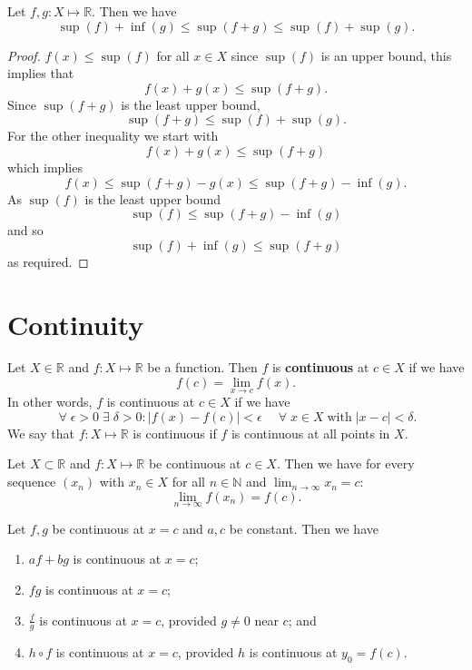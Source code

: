 \begin{proposition}
    Let $f,g:X\mapsto\mathbb R$. Then we have \[\sup(f)+\inf(g)\leq\sup(f+g)\leq\sup(f)+\sup(g).\]
\end{proposition}

\begin{proof}
    $f(x)\leq\sup(f)$ for all $x\in X$ since $\sup(f)$ is an upper bound, this implies that \[f(x)+g(x)\leq\sup(f+g).\] Since $\sup(f+g)$ is the least upper bound, \[\sup(f+g)\leq\sup(f)+\sup(g).\] For the other inequality we start with \[f(x)+g(x)\leq\sup(f+g)\] which implies \[f(x)\leq\sup(f+g)-g(x)\leq\sup(f+g)-\inf(g).\] As $\sup(f)$ is the least upper bound \[\sup(f)\leq\sup(f+g)-\inf(g)\] and so \[\sup(f)+\inf(g)\leq\sup(f+g)\] as required.
\end{proof}

\section{Continuity}

\begin{definition}
    Let $X\in\mathbb R$ and $f:X\mapsto\mathbb R$ be a function. Then $f$ is \textbf{continuous} at $c\in X$ if we have \[f(c)=\lim_{x\to c}f(x).\] In other words, $f$ is continuous at $c\in X$ if we have \[\;\forall\;\epsilon>0\;\exists\;\delta>0:|f(x)-f(c)|<\epsilon\quad\;\forall\;x\in X\;\text{with}\;|x-c|<\delta.\] We say that $f:X\mapsto\mathbb R$ is continuous if $f$ is continuous at all points in $X$.
\end{definition}

\begin{corollary}
    Let $X\subset\mathbb R$ and $f:X\mapsto\mathbb R$ be continuous at $c\in X$. Then we have for every sequence $(x_n)$ with $x_n\in X$ for all $n\in\mathbb N$ and $\lim_{n\to\infty}x_n=c$: \[\lim_{n\to\infty}f(x_n)=f(c).\]
\end{corollary}

\begin{theorem}
    Let $f,g$ be continuous at $x=c$ and $a,c$ be constant. Then we have
    \begin{enumerate}
        \item $af+bg$ is continuous at $x=c$;
        \item $fg$ is continuous at $x=c$;
        \item $\frac fg$ is continuous at $x=c$, provided $g\neq 0$ near $c$; and
        \item $h\circ f$ is continuous at $x=c$, provided $h$ is continuous at $y_0=f(c)$.
    \end{enumerate}
\end{theorem}

